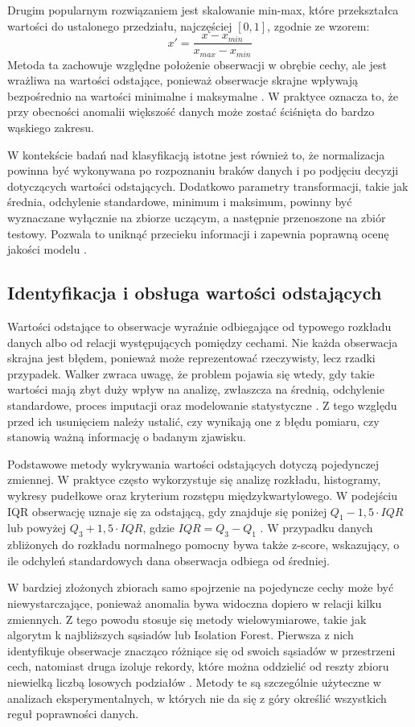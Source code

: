 {Drugim popularnym rozwiązaniem jest skalowanie min-max, które przekształca wartości do ustalonego przedziału, najczęściej $[0,1]$, zgodnie ze wzorem:
\[
x' = \frac{x - x_{min}}{x_{max} - x_{min}}
\]
Metoda ta zachowuje względne położenie obserwacji w obrębie cechy, ale jest wrażliwa na wartości odstające, ponieważ obserwacje skrajne wpływają bezpośrednio na wartości minimalne i maksymalne \cite{SklearnMinMaxScaler}. W praktyce oznacza to, że przy obecności anomalii większość danych może zostać ściśnięta do bardzo wąskiego zakresu.

W kontekście badań nad klasyfikacją istotne jest również to, że normalizacja powinna być wykonywana po rozpoznaniu braków danych i po podjęciu decyzji dotyczących wartości odstających. Dodatkowo parametry transformacji, takie jak średnia, odchylenie standardowe, minimum i maksimum, powinny być wyznaczane wyłącznie na zbiorze uczącym, a następnie przenoszone na zbiór testowy. Pozwala to uniknąć przecieku informacji i zapewnia poprawną ocenę jakości modelu \cite{SklearnPreprocessing}.

\subsection{Identyfikacja i obsługa wartości odstających}
Wartości odstające to obserwacje wyraźnie odbiegające od typowego rozkładu danych albo od relacji występujących pomiędzy cechami. Nie każda obserwacja skrajna jest błędem, ponieważ może reprezentować rzeczywisty, lecz rzadki przypadek. Walker zwraca uwagę, że problem pojawia się wtedy, gdy takie wartości mają zbyt duży wpływ na analizę, zwłaszcza na średnią, odchylenie standardowe, proces imputacji oraz modelowanie statystyczne \cite{Walker2021}. Z tego względu przed ich usunięciem należy ustalić, czy wynikają one z błędu pomiaru, czy stanowią ważną informację o badanym zjawisku.

Podstawowe metody wykrywania wartości odstających dotyczą pojedynczej zmiennej. W praktyce często wykorzystuje się analizę rozkładu, histogramy, wykresy pudełkowe oraz kryterium rozstępu międzykwartylowego. W podejściu IQR obserwację uznaje się za odstającą, gdy znajduje się poniżej $Q_1 - 1{,}5 \cdot IQR$ lub powyżej $Q_3 + 1{,}5 \cdot IQR$, gdzie $IQR = Q_3 - Q_1$ \cite{Walker2021}. W przypadku danych zbliżonych do rozkładu normalnego pomocny bywa także z-score, wskazujący, o ile odchyleń standardowych dana obserwacja odbiega od średniej.

W bardziej złożonych zbiorach samo spojrzenie na pojedyncze cechy może być niewystarczające, ponieważ anomalia bywa widoczna dopiero w relacji kilku zmiennych. Z tego powodu stosuje się metody wielowymiarowe, takie jak algorytm k najbliższych sąsiadów lub Isolation Forest. Pierwsza z nich identyfikuje obserwacje znacząco różniące się od swoich sąsiadów w przestrzeni cech, natomiast druga izoluje rekordy, które można oddzielić od reszty zbioru niewielką liczbą losowych podziałów \cite{Walker2021,Liu2008}. Metody te są szczególnie użyteczne w analizach eksperymentalnych, w których nie da się z góry określić wszystkich reguł poprawności danych.

}
